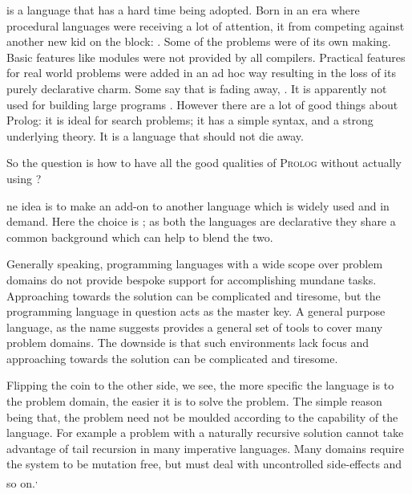 \documentclass[thesis-solanki.tex]{subfiles}
\begin{document}
 is a language that has a hard time being adopted.
Born in an era where procedural languages were receiving a lot of attention, it  from competing against another
new kid on the block: .
Some of the problems were of its own making.
Basic features like modules were not provided by all compilers.
Practical features for real world problems were added in an ad hoc way resulting in the loss of its purely declarative
charm.
Some say that  is fading away, \cite{website:prolog-steam,website:prolog-death,website:prolog-killer}.
It is apparently not used for building large programs \cite{wikiprolog,somogyi1995logic,website:prolog1000db}.
However there are a lot of good things about Prolog: it is ideal for search problems; it has a simple syntax, and a
strong underlying theory.
It is a language that should not die away.

So the question is how to have all the good qualities of \textsc{Prolog} without actually using ?  

ne idea is to make  an add-on to another language which is widely used and in demand.
Here the choice is ; as both the languages are declarative they share a common background which can
help to blend the two.

Generally speaking, programming languages with a wide scope over problem domains do not provide bespoke support for
accomplishing  mundane tasks.
Approaching towards the solution can be complicated and tiresome, but the programming language in question acts as the
master key.%
A general purpose language, as the name suggests provides a general set of tools to cover many problem domains. The downside is that such
environments lack focus and approaching towards the solution can be complicated and tiresome.   


Flipping the coin to the other side, we see, the more specific the language is to the problem domain, the easier it
is to solve the problem.
The simple reason being that, the problem need not be moulded according to the capability  of the
language.
For example\yyy{}{,} a problem with a naturally recursive solution cannot take advantage of tail recursion in many
imperative languages.
Many domains require the system to be mutation free, but must deal with uncontrolled side-effects and so
on.\textsuperscript{,}%
\end{document}
